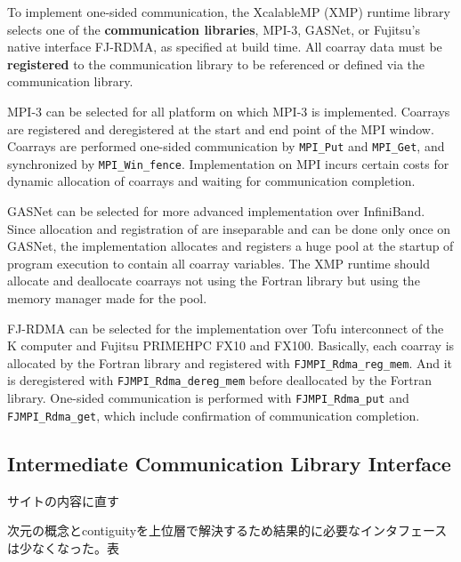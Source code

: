 To implement one-sided communication, the XcalableMP (XMP) runtime library selects one of the 
{\bf communication libraries}, MPI-3, GASNet, or Fujitsu’s native interface FJ-RDMA, 
as specified at build time. All coarray data must be {\bf registered} to the communication 
library to be referenced or defined via the communication library.

MPI-3 can be selected for all platform on which MPI-3 is implemented. Coarrays are 
registered and deregistered at the start and end point of the MPI window. 
Coarrays are performed one-sided communication by {\tt MPI\_Put} and {\tt MPI\_Get}, 
and synchronized by {\tt MPI\_Win\_fence}. 
Implementation on MPI incurs certain costs for dynamic allocation of coarrays and 
waiting for communication completion.

GASNet can be selected for more advanced implementation over InfiniBand. 
Since allocation and registration of are inseparable and can be done only once 
on GASNet, the implementation allocates and registers a huge pool at the startup 
of program execution to contain all coarray variables. 
The XMP runtime should allocate and deallocate coarrays not using the Fortran 
library but using the memory manager made for the pool.

FJ-RDMA can be selected for the implementation over Tofu interconnect of the K computer 
and Fujitsu PRIMEHPC FX10 and FX100. Basically, each coarray is allocated by the Fortran 
library and registered with {\tt FJMPI\_Rdma\_reg\_mem}. And it is deregistered with 
{\tt FJMPI\_Rdma\_dereg\_mem} before deallocated by the Fortran library. 
One-sided communication is performed with {\tt FJMPI\_Rdma\_put} and {\tt FJMPI\_Rdma\_get}, 
which include confirmation of communication completion.


\subsection{Intermediate Communication Library Interface}

サイトの内容に直す




次元の概念とcontiguityを上位層で解決するため結果的に必要なインタフェースは少なくなった。表

